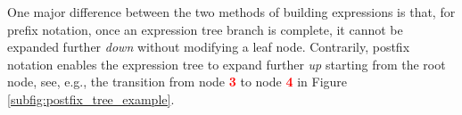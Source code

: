 \documentclass[runningheads]{llncs}
\begin{document}
\par One major difference between the two methods of building expressions is that, for prefix notation, once an expression tree branch is complete, it cannot be expanded further \emph{down} without modifying a leaf node. Contrarily, postfix notation enables the expression tree to expand further \emph{up} starting from the root node, see, e.g., the transition from node \textbf{\textcolor{red}{3}} to node \textbf{\textcolor{red}{4}} in Figure \ref{subfig:postfix_tree_example}.

\end{document}

